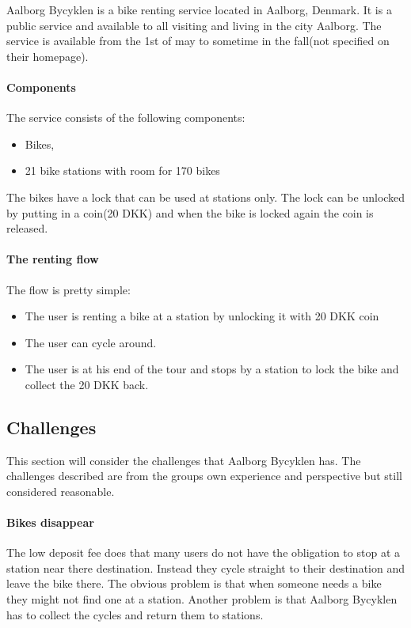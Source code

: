 \label{aalborg_bycyklen}
Aalborg Bycyklen is a bike renting service located in Aalborg, Denmark.
It is a public service and available to all visiting and living in the city Aalborg.
The service is available from the 1st of may to sometime in the fall(not specified on their homepage).
\cite{aalborgbycyklenbagcyklen}

\paragraph{Components}
The service consists of the following components:
\begin{itemize}
\item Bikes, 
\item 21 bike stations with room for 170 bikes
\end{itemize}
The bikes have a lock that can be used at stations only.
The lock can be unlocked by putting in a coin(20 DKK) and when the bike is locked again the coin is released.

\paragraph{The renting flow}
The flow is pretty simple:
\begin{itemize}
\item The user is renting a bike at a station by unlocking it with 20 DKK coin
\item The user can cycle around.
\item The user is at his end of the tour and stops by a station to lock the bike and collect the 20 DKK back.
\end{itemize}

\subsection{Challenges}\label{aalborg_bycyklen:challenges}
This section will consider the challenges that Aalborg Bycyklen has.
The challenges described are from the groups own experience and perspective but still considered reasonable.

\paragraph{Bikes disappear}
The low deposit fee does that many users do not have the obligation to stop at a station near there destination.
Instead they cycle straight to their destination and leave the bike there.
The obvious problem is that when someone needs a bike they might not find one at a station.
Another problem is that Aalborg Bycyklen has to collect the cycles and return them to stations.

